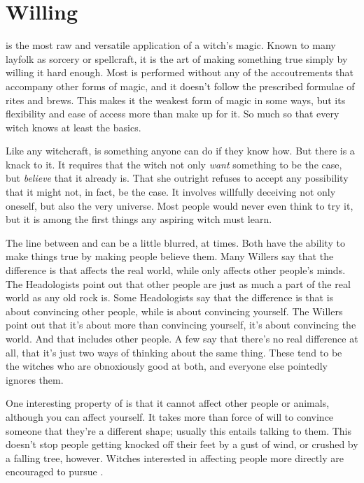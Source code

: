\chapter{Willing}

 is the most raw and versatile application of a witch's magic.
Known to many layfolk as sorcery or spellcraft, it is the art of making something true simply by willing it hard enough.
Most  is performed without any of the accoutrements that accompany other forms of magic, and it doesn't follow the prescribed formulae of rites and brews.
This makes it the weakest form of magic in some ways, but its flexibility and ease of access more than make up for it.
So much so that every witch knows at least the basics.

Like any witchcraft,  is something anyone can do if they know how.
But there is a knack to it.
It requires that the witch not only \emph{want} something to be the case, but \emph{believe} that it already is.
That she outright refuses to accept any possibility that it might not, in fact, be the case.
It involves willfully deceiving not only oneself, but also the very universe.
Most people would never even think to try it, but it is among the first things any aspiring witch must learn.

The line between  and  can be a little blurred, at times.
Both have the ability to make things true by making people believe them.
Many Willers say that the difference is that  affects the real world, while  only affects other people's minds.
The Headologists point out that other people are just as much a part of the real world as any old rock is.
Some Headologists say that the difference is that  is about convincing other people, while  is about convincing yourself.
The Willers point out that it's about more than convincing yourself, it's about convincing the world.
And that includes other people.
A few say that there's no real difference at all, that it's just two ways of thinking about the same thing.
These tend to be the witches who are obnoxiously good at both, and everyone else pointedly ignores them.

One interesting property of  is that it cannot affect other people or animals, although you can affect yourself.
It takes more than force of will to convince someone that they're a different shape; usually this entails talking to them.
This doesn't stop people getting knocked off their feet by a gust of wind, or crushed by a falling tree, however.
Witches interested in affecting people more directly are encouraged to pursue .

